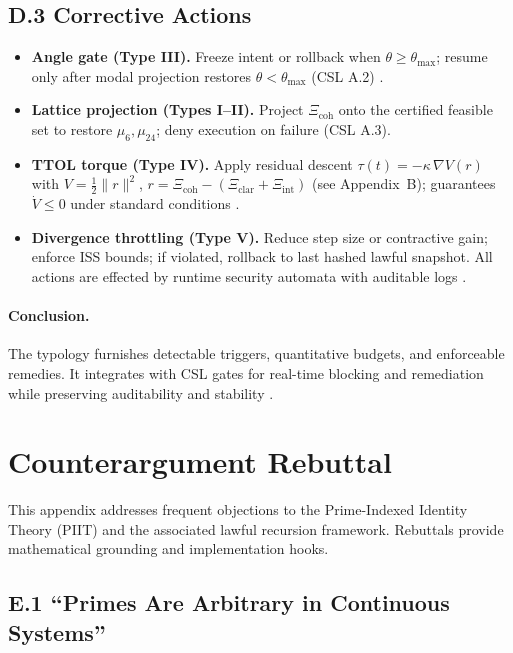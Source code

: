\documentclass[12pt]{amsart}
\theoremstyle{plain}
\begin{document}
\subsection*{D.3 Corrective Actions}
\begin{itemize}
  \item \textbf{Angle gate (Type III).} Freeze intent or rollback when $\theta\ge\theta_{\max}$; resume only after modal projection restores $\theta<\theta_{\max}$ (CSL A.2) \cite{clarke1999model,baier2008model}.
  \item \textbf{Lattice projection (Types I–II).} Project $\Xi_{\mathrm{coh}}$ onto the certified feasible set to restore $\mu_6,\mu_{24}$; deny execution on failure (CSL A.3).
  \item \textbf{TTOL torque (Type IV).} Apply residual descent $\tau(t)=-\kappa\,\nabla V(r)$ with $V=\tfrac12\|r\|^2$, $r=\Xi_{\mathrm{coh}}-(\Xi_{\mathrm{clar}}+\Xi_{\mathrm{int}})$ (see Appendix~B); guarantees $\dot V\le0$ under standard conditions \cite{khalil2002nonlinear}.
  \item \textbf{Divergence throttling (Type V).} Reduce step size or contractive gain; enforce ISS bounds; if violated, rollback to last hashed lawful snapshot. All actions are effected by runtime security automata with auditable logs \cite{schneider2000enforceable}.
\end{itemize}

\paragraph{Conclusion.} The typology furnishes detectable triggers, quantitative budgets, and enforceable remedies. It integrates with CSL gates for real-time blocking and remediation while preserving auditability and stability \cite{schneider2000enforceable,clarke1999model,baier2008model}.

\clearpage

\section{Counterargument Rebuttal}

\noindent This appendix addresses frequent objections to the Prime-Indexed Identity Theory (PIIT) and the associated lawful recursion framework. Rebuttals provide mathematical grounding and implementation hooks.

\subsection*{E.1 “Primes Are Arbitrary in Continuous Systems”}
\end{document}
